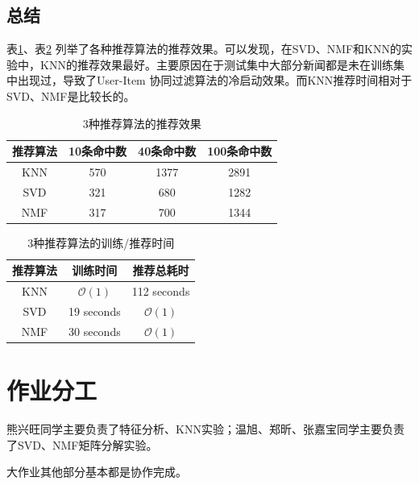 \documentclass[UTF8]{article}
\begin{document}
\subsection{总结}
表\ref{tab:algo-compare-result}、表\ref{tab:algo-compare-time} 列举了各种推荐算法的推荐效果。可以发现，在SVD、NMF和KNN的实验中，KNN的推荐效果最好。主要原因在于测试集中大部分新闻都是未在训练集中出现过，导致了User-Item 协同过滤算法的冷启动效果。而KNN推荐时间相对于SVD、NMF是比较长的。
\begin{table}[h]
    \centering
    \caption{3种推荐算法的推荐效果}
    \label{tab:algo-compare-result}
    \begin{tabular}{|c|c|c|c|}
        \hline
        \textbf{推荐算法} & \textbf{10条命中数} & \textbf{40条命中数} & \textbf{100条命中数} \\
        \hline
        KNN & 570 & 1377 & 2891\\
        \hline
        SVD & 321 & 680 & 1282\\
        \hline
        NMF & 317 & 700 & 1344\\
        \hline
    \end{tabular}
\end{table}
\begin{table}[h]
    \centering
    \caption{3种推荐算法的训练/推荐时间}
    \label{tab:algo-compare-time}
    \begin{tabular}{|c|c|c|}
        \hline
        \textbf{推荐算法} & \textbf{训练时间} & \textbf{推荐总耗时} \\
        \hline
        KNN & $\mathcal{O}(1)$ & 112 seconds\\
        \hline
        SVD & 19 seconds & $\mathcal{O}(1)$\\
        \hline
        NMF & 30 seconds & $\mathcal{O}(1)$\\
        \hline
    \end{tabular}
\end{table}

\section{作业分工}
熊兴旺同学主要负责了特征分析、KNN实验；温旭、郑昕、张嘉宝同学主要负责了SVD、NMF矩阵分解实验。

大作业其他部分基本都是协作完成。
\end{document}
